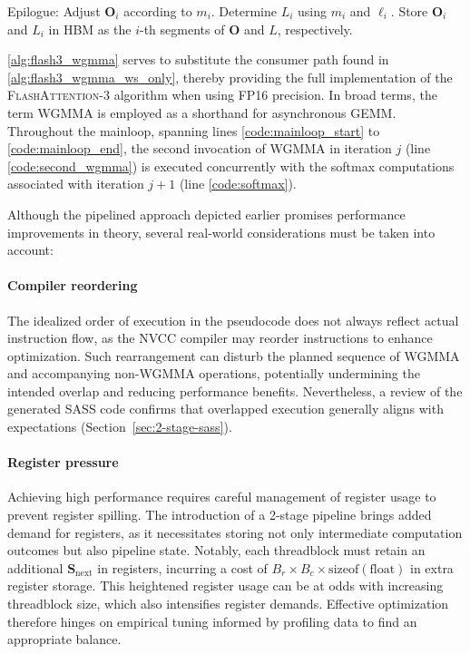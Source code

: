 \begin{enumerate}
\begin{algorithm}[H]
\begin{algorithmic}[1]
\STATE Epilogue: Adjust $\mathbf{O}_{i}$ according to $m_{i}$. Determine $L_{i}$ using $m_{i}$ and $\ell_{i}$.
Store $\mathbf{O}_{i}$ and $L_{i}$ in HBM as the $i$-th segments of $\mathbf{O}$ and $L$, respectively.
\end{algorithmic}
\end{algorithm}

\cref{alg:flash3_wgmma} serves to substitute the consumer path found in \cref{alg:flash3_wgmma_ws_only}, thereby providing the full implementation of the \textsc{FlashAttention-3} algorithm when using FP16 precision. In broad terms, the term WGMMA is employed as a shorthand for asynchronous GEMM. Throughout the mainloop, spanning lines \ref{code:mainloop_start} to \ref{code:mainloop_end}, the second invocation of WGMMA in iteration $j$ (line \ref{code:second_wgmma}) is executed concurrently with the softmax computations associated with iteration $j+1$ (line \ref{code:softmax}).

Although the pipelined approach depicted earlier promises performance improvements in theory, several real-world considerations must be taken into account:

\paragraph{Compiler reordering} The idealized order of execution in the pseudocode does not always reflect actual instruction flow, as the NVCC compiler may reorder instructions to enhance optimization. Such rearrangement can disturb the planned sequence of WGMMA and accompanying non-WGMMA operations, potentially undermining the intended overlap and reducing performance benefits. Nevertheless, a review of the generated SASS code confirms that overlapped execution generally aligns with expectations (Section~\ref{sec:2-stage-sass}).

\paragraph{Register pressure} Achieving high performance requires careful management of register usage to prevent register spilling. The introduction of a 2-stage pipeline brings added demand for registers, as it necessitates storing not only intermediate computation outcomes but also pipeline state. Notably, each threadblock must retain an additional $\mathbf{S}_{\mathrm{next}}$ in registers, incurring a cost of $B_r \times B_c \times \text{sizeof}(\text{float})$ in extra register storage. This heightened register usage can be at odds with increasing threadblock size, which also intensifies register demands. Effective optimization therefore hinges on empirical tuning informed by profiling data to find an appropriate balance.


\end{enumerate}
